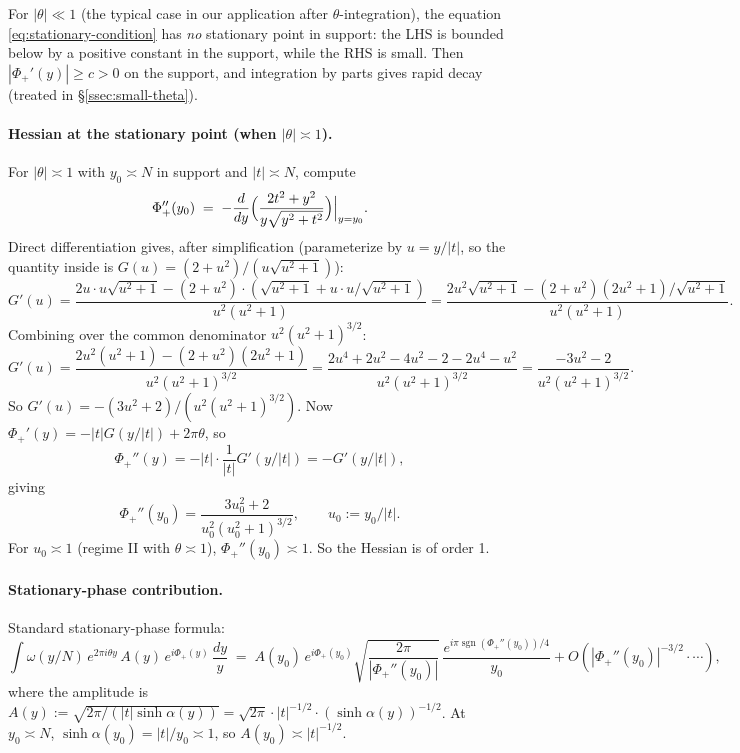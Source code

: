 \documentclass[11pt]{article}
\theoremstyle{definition}
\DeclareMathOperator{\sgn}{sgn}
\begin{document}
For $|\theta| \ll 1$ (the typical case in our application after $\theta$-integration), the equation \eqref{eq:stationary-condition} has \emph{no} stationary point in support: the LHS is bounded below by a positive constant in the support, while the RHS is small. Then $|\Phi_+'(y)| \ge c > 0$ on the support, and integration by parts gives rapid decay (treated in \S\ref{ssec:small-theta}).

\paragraph{Hessian at the stationary point (when $|\theta| \asymp 1$).}
For $|\theta| \asymp 1$ with $y_0 \asymp N$ in support and $|t| \asymp N$, compute
\[
    \Phi_+''(y_0) \;=\; -\frac{d}{dy}\Bigl(\frac{2t^2+y^2}{y\sqrt{y^2+t^2}}\Bigr)\Big|_{y=y_0}.
\]
Direct differentiation gives, after simplification (parameterize by $u = y/|t|$, so the quantity inside is $G(u) = (2+u^2)/(u\sqrt{u^2+1})$):
\[
    G'(u) = \frac{2u\cdot u\sqrt{u^2+1} - (2+u^2)\cdot(\sqrt{u^2+1} + u\cdot u/\sqrt{u^2+1})}{u^2(u^2+1)}
          = \frac{2u^2\sqrt{u^2+1}-(2+u^2)(2u^2+1)/\sqrt{u^2+1}}{u^2(u^2+1)}.
\]
Combining over the common denominator $u^2(u^2+1)^{3/2}$:
\[
    G'(u) = \frac{2u^2(u^2+1) - (2+u^2)(2u^2+1)}{u^2(u^2+1)^{3/2}}
          = \frac{2u^4+2u^2 - 4u^2 - 2 - 2u^4 - u^2}{u^2(u^2+1)^{3/2}}
          = \frac{-3u^2 - 2}{u^2(u^2+1)^{3/2}}.
\]
So $G'(u) = -(3u^2+2)/(u^2(u^2+1)^{3/2})$. Now $\Phi_+'(y) = -|t|G(y/|t|) + 2\pi\theta$, so
\[
    \Phi_+''(y) = -|t|\cdot\frac{1}{|t|}G'(y/|t|) = -G'(y/|t|),
\]
giving
\[
    \Phi_+''(y_0) = \frac{3u_0^2+2}{u_0^2(u_0^2+1)^{3/2}}, \qquad u_0 := y_0/|t|.
\]
For $u_0 \asymp 1$ (regime II with $\theta \asymp 1$), $\Phi_+''(y_0) \asymp 1$. So the Hessian is of order 1.

\paragraph{Stationary-phase contribution.}
Standard stationary-phase formula:
\[
    \int \omega(y/N)\,e^{2\pi i\theta y}\,A(y)\,e^{i\Phi_+(y)}\,\frac{dy}{y}
    \;=\; A(y_0)\,e^{i\Phi_+(y_0)}\sqrt{\frac{2\pi}{|\Phi_+''(y_0)|}}\,\frac{e^{i\pi\sgn(\Phi_+''(y_0))/4}}{y_0} + O(|\Phi_+''(y_0)|^{-3/2}\cdot \cdots),
\]
where the amplitude is $A(y) := \sqrt{2\pi/(|t|\sinh\alpha(y))} = \sqrt{2\pi}\cdot|t|^{-1/2}\cdot(\sinh\alpha(y))^{-1/2}$. At $y_0 \asymp N$, $\sinh\alpha(y_0) = |t|/y_0 \asymp 1$, so $A(y_0) \asymp |t|^{-1/2}$.
\end{document}
